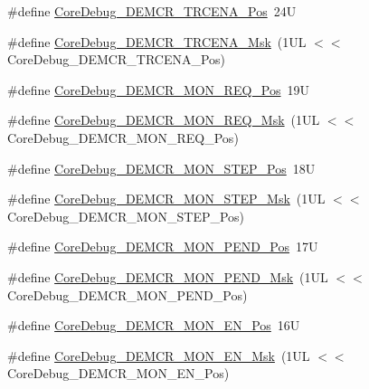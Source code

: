 \begin{DoxyCompactItemize}
\item 
\#define \mbox{\hyperlink{group___c_m_s_i_s___core_debug_ga6ff2102b98f86540224819a1b767ba39}{Core\+Debug\+\_\+\+D\+E\+M\+C\+R\+\_\+\+T\+R\+C\+E\+N\+A\+\_\+\+Pos}}~24U
\item 
\#define \mbox{\hyperlink{group___c_m_s_i_s___core_debug_ga5e99652c1df93b441257389f49407834}{Core\+Debug\+\_\+\+D\+E\+M\+C\+R\+\_\+\+T\+R\+C\+E\+N\+A\+\_\+\+Msk}}~(1\+U\+L $<$$<$ Core\+Debug\+\_\+\+D\+E\+M\+C\+R\+\_\+\+T\+R\+C\+E\+N\+A\+\_\+\+Pos)
\item 
\#define \mbox{\hyperlink{group___c_m_s_i_s___core_debug_ga341020a3b7450416d72544eaf8e57a64}{Core\+Debug\+\_\+\+D\+E\+M\+C\+R\+\_\+\+M\+O\+N\+\_\+\+R\+E\+Q\+\_\+\+Pos}}~19U
\item 
\#define \mbox{\hyperlink{group___c_m_s_i_s___core_debug_gae6384cbe8045051186d13ef9cdeace95}{Core\+Debug\+\_\+\+D\+E\+M\+C\+R\+\_\+\+M\+O\+N\+\_\+\+R\+E\+Q\+\_\+\+Msk}}~(1\+U\+L $<$$<$ Core\+Debug\+\_\+\+D\+E\+M\+C\+R\+\_\+\+M\+O\+N\+\_\+\+R\+E\+Q\+\_\+\+Pos)
\item 
\#define \mbox{\hyperlink{group___c_m_s_i_s___core_debug_ga9ae10710684e14a1a534e785ef390e1b}{Core\+Debug\+\_\+\+D\+E\+M\+C\+R\+\_\+\+M\+O\+N\+\_\+\+S\+T\+E\+P\+\_\+\+Pos}}~18U
\item 
\#define \mbox{\hyperlink{group___c_m_s_i_s___core_debug_ga2ded814556de96fc369de7ae9a7ceb98}{Core\+Debug\+\_\+\+D\+E\+M\+C\+R\+\_\+\+M\+O\+N\+\_\+\+S\+T\+E\+P\+\_\+\+Msk}}~(1\+U\+L $<$$<$ Core\+Debug\+\_\+\+D\+E\+M\+C\+R\+\_\+\+M\+O\+N\+\_\+\+S\+T\+E\+P\+\_\+\+Pos)
\item 
\#define \mbox{\hyperlink{group___c_m_s_i_s___core_debug_ga1e2f706a59e0d8131279af1c7e152f8d}{Core\+Debug\+\_\+\+D\+E\+M\+C\+R\+\_\+\+M\+O\+N\+\_\+\+P\+E\+N\+D\+\_\+\+Pos}}~17U
\item 
\#define \mbox{\hyperlink{group___c_m_s_i_s___core_debug_ga68ec55930269fab78e733dcfa32392f8}{Core\+Debug\+\_\+\+D\+E\+M\+C\+R\+\_\+\+M\+O\+N\+\_\+\+P\+E\+N\+D\+\_\+\+Msk}}~(1\+U\+L $<$$<$ Core\+Debug\+\_\+\+D\+E\+M\+C\+R\+\_\+\+M\+O\+N\+\_\+\+P\+E\+N\+D\+\_\+\+Pos)
\item 
\#define \mbox{\hyperlink{group___c_m_s_i_s___core_debug_ga802829678f6871863ae9ecf60a10425c}{Core\+Debug\+\_\+\+D\+E\+M\+C\+R\+\_\+\+M\+O\+N\+\_\+\+E\+N\+\_\+\+Pos}}~16U
\item 
\#define \mbox{\hyperlink{group___c_m_s_i_s___core_debug_gac2b46b9b65bf8d23027f255fc9641977}{Core\+Debug\+\_\+\+D\+E\+M\+C\+R\+\_\+\+M\+O\+N\+\_\+\+E\+N\+\_\+\+Msk}}~(1\+U\+L $<$$<$ Core\+Debug\+\_\+\+D\+E\+M\+C\+R\+\_\+\+M\+O\+N\+\_\+\+E\+N\+\_\+\+Pos)
$$
\end{DoxyCompactItemize}
